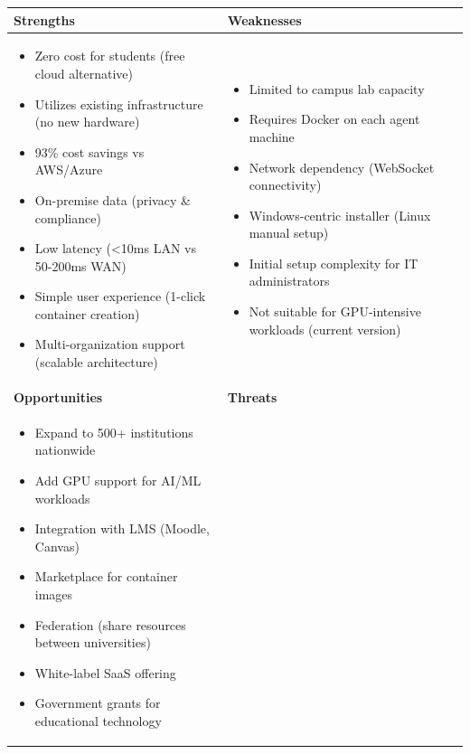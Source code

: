 \documentclass[12pt,a4paper]{article}
\begin{document}
\begin{table}[h]
\fontsize{10}{12}\selectfont
\begin{tabular}{|p{7.5cm}|p{7.5cm}|}
\hline
\textbf{Strengths} & \textbf{Weaknesses} \\
\hline
\begin{itemize}[noitemsep,leftmargin=*]
    \item Zero cost for students (free cloud alternative)
    \item Utilizes existing infrastructure (no new hardware)
    \item 93\% cost savings vs AWS/Azure
    \item On-premise data (privacy \& compliance)
    \item Low latency (<10ms LAN vs 50-200ms WAN)
    \item Simple user experience (1-click container creation)
    \item Multi-organization support (scalable architecture)
\end{itemize} &
\begin{itemize}[noitemsep,leftmargin=*]
    \item Limited to campus lab capacity
    \item Requires Docker on each agent machine
    \item Network dependency (WebSocket connectivity)
    \item Windows-centric installer (Linux manual setup)
    \item Initial setup complexity for IT administrators
    \item Not suitable for GPU-intensive workloads (current version)
\end{itemize} \\
\hline
\textbf{Opportunities} & \textbf{Threats} \\
\hline
\begin{itemize}[noitemsep,leftmargin=*]
    \item Expand to 500+ institutions nationwide
    \item Add GPU support for AI/ML workloads
    \item Integration with LMS (Moodle, Canvas)
    \item Marketplace for container images
    \item Federation (share resources between universities)
    \item White-label SaaS offering
    \item Government grants for educational technology
\end{itemize} &

\end{tabular}
\end{table}
\end{document}
